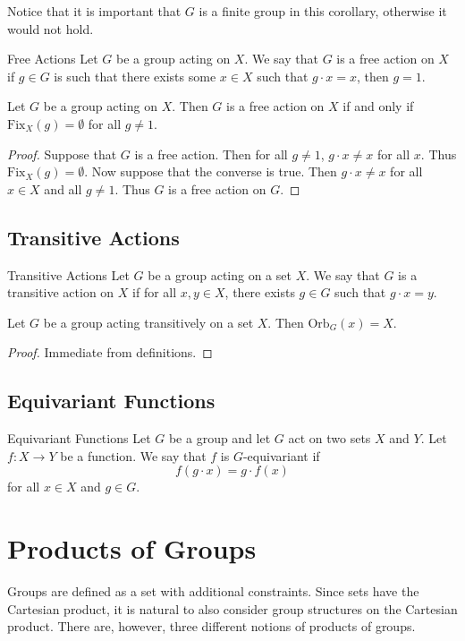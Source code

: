 \documentclass[a4paper]{article}
\begin{document}
Notice that it is important that $G$ is a finite group in this corollary, otherwise it would not hold. 

\begin{defn}{Free Actions}{} Let $G$ be a group acting on $X$. We say that $G$ is a free action on $X$ if $g\in G$ is such that there exists some $x\in X$ such that $g\cdot x=x$, then $g=1$. 
\end{defn}

\begin{lmm}{}{} Let $G$ be a group acting on $X$. Then $G$ is a free action on $X$ if and only if $\text{Fix}_X(g)=\emptyset$ for all $g\neq 1$. \tcbline
\begin{proof}
Suppose that $G$ is a free action. Then for all $g\neq 1$, $g\cdot x\neq x$ for all $x$. Thus $\text{Fix}_X(g)=\emptyset$. Now suppose that the converse is true. Then $g\cdot x\neq x$ for all $x\in X$ and all $g\neq 1$. Thus $G$ is a free action on $G$. 
\end{proof}
\end{lmm}

\subsection{Transitive Actions}
\begin{defn}{Transitive Actions}{} Let $G$ be a group acting on a set $X$. We say that $G$ is a transitive action on $X$ if for all $x,y\in X$, there exists $g\in G$ such that $g\cdot x=y$. 
\end{defn}

\begin{lmm}{}{} Let $G$ be a group acting transitively on a set $X$. Then $\text{Orb}_G(x)=X$. \tcbline
\begin{proof}
Immediate from definitions. 
\end{proof}
\end{lmm}

\subsection{Equivariant Functions}
\begin{defn}{Equivariant Functions}{} Let $G$ be a group and let $G$ act on two sets $X$ and $Y$. Let $f:X\to Y$ be a function. We say that $f$ is $G$-equivariant if $$f(g\cdot x)=g\cdot f(x)$$ for all $x\in X$ and $g\in G$. 
\end{defn}

\pagebreak
\section{Products of Groups}
Groups are defined as a set with additional constraints. Since sets have the Cartesian product, it is natural to also consider group structures on the Cartesian product. There are, however, three different notions of products of groups. 
\end{document}
